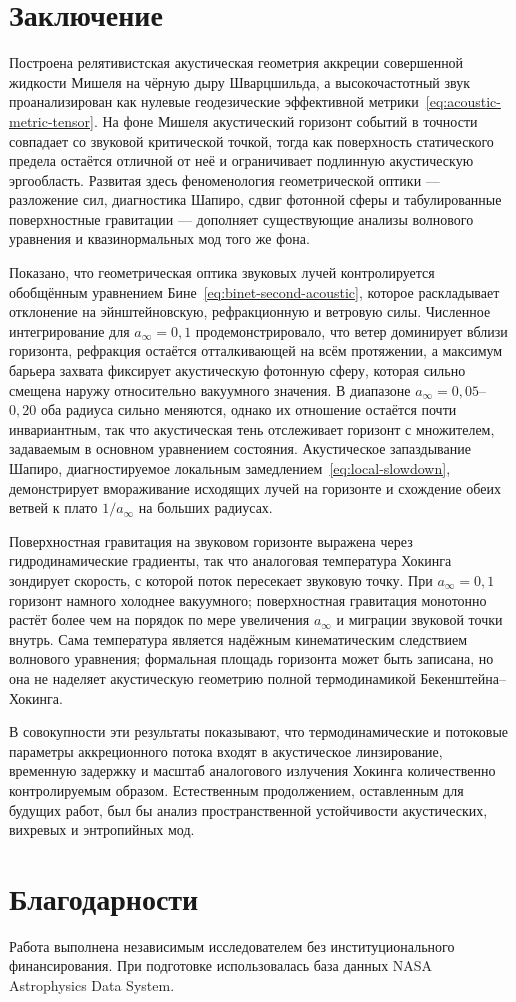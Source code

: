 \documentclass[12pt,a4paper,preprint]{elsarticle}
\begin{document}
    \section{Заключение}\label{sec:conclusions}
        Построена релятивистская акустическая геометрия аккреции совершенной жидкости Мишеля на чёрную дыру Шварцшильда, а высокочастотный звук проанализирован как нулевые геодезические эффективной метрики~\eqref{eq:acoustic-metric-tensor}. На фоне Мишеля акустический горизонт событий в точности совпадает со звуковой критической точкой, тогда как поверхность статического предела остаётся отличной от неё и ограничивает подлинную акустическую эргообласть. Развитая здесь феноменология геометрической оптики --- разложение сил, диагностика Шапиро, сдвиг фотонной сферы и табулированные поверхностные гравитации --- дополняет существующие анализы волнового уравнения и квазинормальных мод того же фона.

        Показано, что геометрическая оптика звуковых лучей контролируется обобщённым уравнением Бине~\eqref{eq:binet-second-acoustic}, которое раскладывает отклонение на эйнштейновскую, рефракционную и ветровую силы. Численное интегрирование для $a_{\infty}=0{,}1$ продемонстрировало, что ветер доминирует вблизи горизонта, рефракция остаётся отталкивающей на всём протяжении, а максимум барьера захвата фиксирует акустическую фотонную сферу, которая сильно смещена наружу относительно вакуумного значения. В диапазоне $a_{\infty}=0{,}05$--$0{,}20$ оба радиуса сильно меняются, однако их отношение остаётся почти инвариантным, так что акустическая тень отслеживает горизонт с множителем, задаваемым в основном уравнением состояния. Акустическое запаздывание Шапиро, диагностируемое локальным замедлением~\eqref{eq:local-slowdown}, демонстрирует вмораживание исходящих лучей на горизонте и схождение обеих ветвей к плато $1/a_{\infty}$ на больших радиусах.

        Поверхностная гравитация на звуковом горизонте выражена через гидродинамические градиенты, так что аналоговая температура Хокинга зондирует скорость, с которой поток пересекает звуковую точку. При $a_{\infty}=0{,}1$ горизонт намного холоднее вакуумного; поверхностная гравитация монотонно растёт более чем на порядок по мере увеличения $a_{\infty}$ и миграции звуковой точки внутрь. Сама температура является надёжным кинематическим следствием волнового уравнения; формальная площадь горизонта может быть записана, но она не наделяет акустическую геометрию полной термодинамикой Бекенштейна--Хокинга.

        В совокупности эти результаты показывают, что термодинамические и потоковые параметры аккреционного потока входят в акустическое линзирование, временную задержку и масштаб аналогового излучения Хокинга количественно контролируемым образом. Естественным продолжением, оставленным для будущих работ, был бы анализ пространственной устойчивости акустических, вихревых и энтропийных мод.

    \section*{Благодарности}
        Работа выполнена независимым исследователем без институционального финансирования. При подготовке использовалась база данных NASA Astrophysics Data System.



\end{document}
